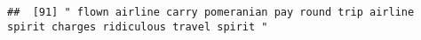 \documentclass[
]{article}
\begin{document}
\begin{verbatim}
##  [91] " flown airline carry pomeranian pay round trip airline spirit charges ridiculous travel spirit "                                                                                                                                                                                                                                                                                                                                                                                                                                                                                                                                                                                                                                                                                                                                                                                                                                                                                                                                                                                                                                                                                                                                                                                                                                                                                                                                                                                                                                                                                                                                                                                                                                                                                               

\end{verbatim}
\end{document}
